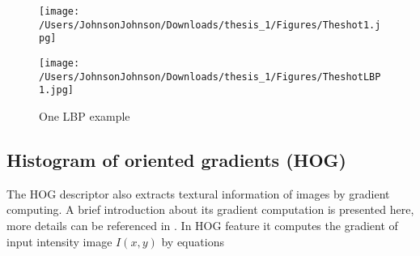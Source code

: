 \begin{figure}[H]
\begin{minipage}[t]{0.5\linewidth}
\centering
\texttt{[image: /Users/JohnsonJohnson/Downloads/thesis\_1/Figures/Theshot1.jpg]}
\end{minipage}%
\begin{minipage}[t]{0.5\linewidth}
\centering
\texttt{[image: /Users/JohnsonJohnson/Downloads/thesis\_1/Figures/TheshotLBP1.jpg]}
\end{minipage}
\caption{One LBP example}
\label{LBPdemoshot}
\end{figure}


\subsection{Histogram of oriented gradients (HOG)}
The HOG \cite{HOG} descriptor also extracts textural information of images by gradient computing. A brief introduction about its gradient computation is presented here, more details can be referenced in \cite{HOG}. In HOG feature it computes the gradient of input intensity  image $I(x, y)$ by equations 

